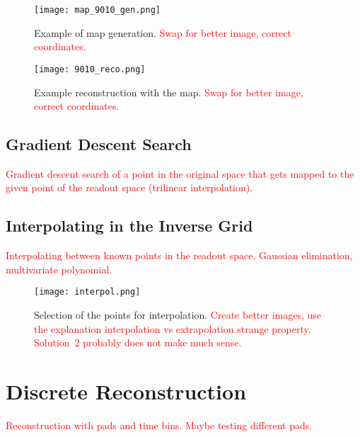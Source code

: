 		\begin{figure}
			\centering
			\texttt{[image: map\_9010\_gen.png]}
			\caption{Example of map generation. \textcolor{red}{Swap for better image, correct coordinates.}}
			\label{fig:map9010gen}
		\end{figure}
		
		\begin{figure}
			\centering
			\texttt{[image: 9010\_reco.png]}
			\caption{Example reconstruction with the map. \textcolor{red}{Swap for better image, correct coordinates.}}
			\label{fig:9010reco}
		\end{figure}
		
		\subsection{Gradient Descent Search}
			\label{sec:grad}
			\textcolor{red}{Gradient descent search of a point in the original space that gets mapped to the given point of the readout space (trilinear interpolation).}
		
		\subsection{Interpolating in the Inverse Grid}
			\textcolor{red}{Interpolating between known points in the readout space. Gaussian elimination, multivariate polynomial.}
			
			\begin{figure}
				\centering
				\texttt{[image: interpol.png]}
				\caption{Selection of the points for interpolation. \textcolor{red}{Create better images, use the explanation interpolation vs extrapolation strange property. Solution~2 probably does not make much sense.}}
				\label{fig:interpol}
			\end{figure}
		
	\section{Discrete Reconstruction}
		\textcolor{red}{Reconstruction with pads and time bins. Maybe testing different pads.}